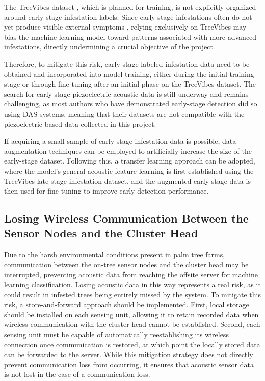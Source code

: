 \documentclass[12pt,a4paper,oneside]{memoir}
\begin{document}
The TreeVibes dataset \cite{rigakis2021}, which is planned for training, is not explicitly organized around early-stage infestation labels. Since early-stage infestations often do not yet produce visible external symptoms \cite{pinhas2008,sutanto2023}, relying exclusively on TreeVibes may bias the machine learning model toward patterns associated with more advanced infestations, directly undermining a crucial objective of the project.

Therefore, to mitigate this risk, early-stage labeled infestation data need to be obtained and incorporated into model training, either during the initial training stage or through fine-tuning after an initial phase on the TreeVibes dataset. The search for early-stage piezoelectric acoustic data is still underway and remains challenging, as most authors who have demonstrated early-stage detection did so using DAS systems, meaning that their datasets are not compatible with the piezoelectric-based data collected in this project.

If acquiring a small sample of early-stage infestation data is possible, data augmentation techniques can be employed \cite{rezaul2024,turskis} to artificially increase the size of the early-stage dataset. Following this, a transfer learning approach can be adopted, where the model's general acoustic feature learning is first established using the TreeVibes late-stage infestation dataset, and the augmented early-stage data is then used for fine-tuning to improve early detection performance.

\subsection{Losing Wireless Communication Between the Sensor Nodes and the Cluster Head}

Due to the harsh environmental conditions present in palm tree farms, communication between the on-tree sensor nodes and the cluster head may be interrupted, preventing acoustic data from reaching the offsite server for machine learning classification. Losing acoustic data in this way represents a real risk, as it could result in infested trees being entirely missed by the system. To mitigate this risk, a store-and-forward approach should be implemented. First, local storage should be installed on each sensing unit, allowing it to retain recorded data when wireless communication with the cluster head cannot be established. Second, each sensing unit must be capable of automatically reestablishing its wireless connection once communication is restored, at which point the locally stored data can be forwarded to the server. While this mitigation strategy does not directly prevent communication loss from occurring, it ensures that acoustic sensor data is not lost in the case of a communication loss.
\end{document}

